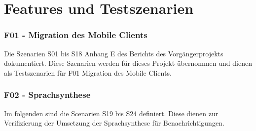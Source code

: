 \section{Features und Testszenarien}

\subsubsection*{F01 - Migration des Mobile Clients}

Die Szenarien S01 bis S18 Anhang E des Berichts des Vorgängerprojekts dokumentiert.\cite{ip5}
Diese Szenarien werden für dieses Projekt übernommen und dienen als Testszenarien für F01 Migration des Mobile Clients.

\subsubsection*{F02 - Sprachsynthese}

Im folgenden sind die Scenarien S19 bis S24 definiert.
Diese dienen zur Verifizierung der Umsetzung der Sprachsynthese für Benachrichtigungen.

